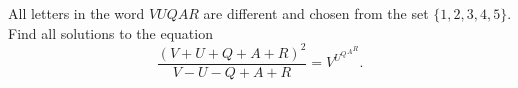 All letters in the word $VUQAR$  are different and chosen from the set $\{1,2,3,4,5\}$. Find all solutions to the equation \[\frac{(V+U+Q+A+R)^2}{V-U-Q+A+R}=V^{{{U^Q}^A}^R}.\]